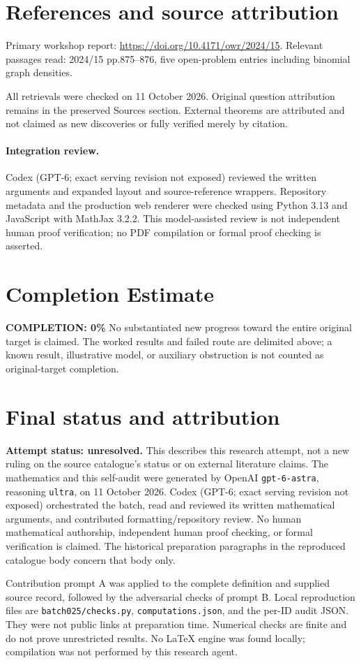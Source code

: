 \documentclass[11pt]{article}
\begin{document}
\section{References and source attribution}
Primary workshop report: \url{https://doi.org/10.4171/owr/2024/15}. Relevant passages read: 2024/15 pp.875--876, five open-problem entries including binomial graph densities.

All retrievals were checked on 11 October 2026. Original question attribution remains in the preserved Sources section. External theorems are attributed and not claimed as new discoveries or fully verified merely by citation.


\paragraph{Integration review.} Codex (GPT-6; exact serving revision not exposed) reviewed the written arguments and expanded layout and source-reference wrappers. Repository metadata and the production web renderer were checked using Python 3.13 and JavaScript with MathJax 3.2.2. This model-assisted review is not independent human proof verification; no PDF compilation or formal proof checking is asserted.

\section{Completion Estimate}
\noindent\textbf{COMPLETION: 0\%}
No substantiated new progress toward the entire original target is claimed. The worked results and failed route are delimited above; a known result, illustrative model, or auxiliary obstruction is not counted as original-target completion.

\section{Final status and attribution}
\textbf{Attempt status: unresolved.} This describes this research attempt, not a new ruling on the source catalogue's status or on external literature claims.
The mathematics and this self-audit were generated by OpenAI \texttt{gpt-6-astra}, reasoning \texttt{ultra}, on 11 October 2026. Codex (GPT-6; exact serving revision not exposed) orchestrated the batch, read and reviewed its written mathematical arguments, and contributed formatting/repository review. No human mathematical authorship, independent human proof checking, or formal verification is claimed. The historical preparation paragraphs in the reproduced catalogue body concern that body only.

Contribution prompt A was applied to the complete definition and supplied source record, followed by the adversarial checks of prompt B. Local reproduction files are \texttt{batch025/checks.py}, \texttt{computations.json}, and the per-ID audit JSON. They were not public links at preparation time. Numerical checks are finite and do not prove unrestricted results. No LaTeX engine was found locally; compilation was not performed by this research agent.
\end{document}
